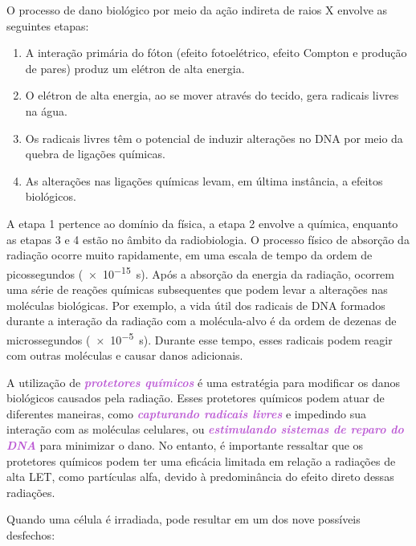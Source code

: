 \documentclass[11pt,a4paper]{article}
\newcounter{exemplo}
\begin{document}
	O processo de dano biológico por meio da ação indireta de raios X envolve as seguintes etapas:

	\begin{enumerate}
	\item A interação primária do fóton (efeito fotoelétrico, efeito Compton e produção de pares) produz um elétron de alta energia.
	\item O elétron de alta energia, ao se mover através do tecido, gera radicais livres na água.
	\item Os radicais livres têm o potencial de induzir alterações no DNA por meio da quebra de ligações químicas.
	\item As alterações nas ligações químicas levam, em última instância, a efeitos biológicos.
	\end{enumerate}

	A etapa 1 pertence ao domínio da física, a etapa 2 envolve a química, enquanto as etapas 3 e 4 estão no âmbito da radiobiologia. O processo físico de absorção da radiação ocorre muito rapidamente, em uma escala de tempo da ordem de picossegundos (\SI{e-15}{\second}). Após a absorção da energia da radiação, ocorrem uma série de reações químicas subsequentes que podem levar a alterações nas moléculas biológicas. Por exemplo, a vida útil dos radicais de DNA formados durante a interação da radiação com a molécula-alvo é da ordem de dezenas de microssegundos (\SI{e-5}{\second}). Durante esse tempo, esses radicais podem reagir com outras moléculas e causar danos adicionais.

	A utilização de \textcolor{MediumOrchid}{\textbf{\textit{protetores químicos}}} é uma estratégia para modificar os danos biológicos causados pela radiação. Esses protetores químicos podem atuar de diferentes maneiras, como \textcolor{MediumOrchid}{\textbf{\textit{capturando radicais livres}}} e impedindo sua interação com as moléculas celulares, ou \textcolor{MediumOrchid}{\textbf{\textit{estimulando sistemas de reparo do DNA}}} para minimizar o dano. No entanto, é importante ressaltar que os protetores químicos podem ter uma eficácia limitada em relação a radiações de alta LET, como partículas alfa, devido à predominância do efeito direto dessas radiações.

	Quando uma célula é irradiada, pode resultar em um dos nove possíveis desfechos:
\end{document}
